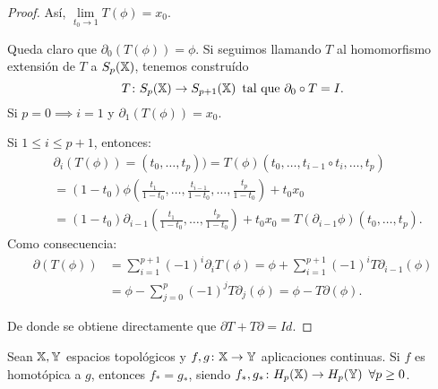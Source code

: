 \begin{proof}
  Así, $\lim\limits_{t_0 \to 1} T(\phi) = x_0$.

  Queda claro que $\partial_0(T(\phi)) = \phi$. Si seguimos llamando $T$ al homomorfismo extensión de $T$ a $S_{p}({\mathbb X})$, tenemos construído
  \[  T \colon S_{p}({\mathbb X}) \to S_{p+1}({\mathbb X}) \hspace{0.5em} \text{tal que } \partial_0 \circ  T = I. \]
  Si $p = 0 \implies i = 1$ y $\partial_1( T(\phi)) = x_0$.

  Si $1 \leq i \leq p+1$, entonces:
  \begin{align*}
    &\partial_i( T(\phi))=(t_0,\dots,t_p)) =  T(\phi)(t_0, \dots, t_{i-1} \circ t_i, \dots, t_p) \\
    &= (1-t_0)\phi(\frac{t_1}{1-t_0}, \dots, \frac{t_{i-1}}{1-t_0}, \dots, \frac{t_p}{1-t_0}) + t_0 x_0 \\
    &= (1-t_0)\partial_{i-1}(\frac{t_1}{1-t_0}, \dots, \frac{t_p}{1-t_0}) + t_0 x_0 = T(\partial_{i-1} \phi)(t_0, \dots, t_p).
  \end{align*}
  Como consecuencia:
  \begin{align*}
    \partial( T(\phi)) &= \sum\limits_{i = 1}^{p+1} (-1)^i \partial_i  T(\phi) = \phi + \sum\limits_{i = 1}^{p+1} (-1)^i  T \partial_{i-1}(\phi) \\
    &= \phi - \sum\limits_{j = 0}^p (-1)^j  T \partial_j(\phi) = \phi -  T \partial(\phi).
  \end{align*}

  De donde se obtiene directamente que $\partial  T +  T \partial = Id$.
\end{proof}

\begin{theorem}
  Sean ${\mathbb X}, {\mathbb Y}$ espacios topológicos y $f, g \colon {\mathbb X} \to {\mathbb Y}$ aplicaciones continuas. Si $f$ es homotópica a $g$,
  entonces $f_* = g_*$, siendo $f_*, g_* \colon H_p({\mathbb X}) \to H_p({\mathbb Y}) \hspace{0.5em} \forall p \geq 0$.
\end{theorem}

